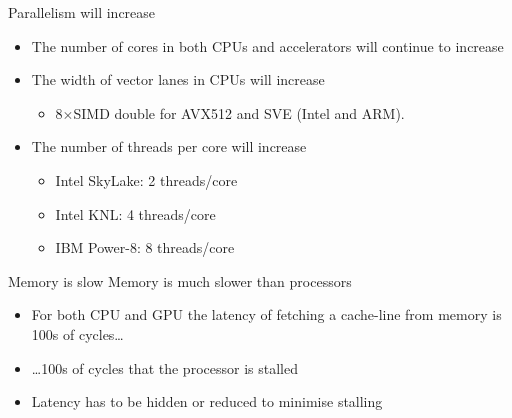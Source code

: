 \documentclass[aspectratio=43]{beamer}
\begin{document}
\begin{frame}[fragile]{Parallelism will increase}
    \begin{itemize}
        \item The number of cores in both CPUs and accelerators will continue to increase
        \item The width of vector lanes in CPUs will increase
        \begin{itemize}
            \item 8$\times$SIMD double for AVX512 and SVE (Intel and ARM).
        \end{itemize}
        \item The number of threads per core will increase
        \begin{itemize}
            \item Intel SkyLake: 2 threads/core
            \item Intel KNL: 4 threads/core
            \item IBM Power-8: 8 threads/core
        \end{itemize}
    \end{itemize}
\end{frame}

\begin{frame}[fragile]{Memory is slow}
    Memory is much slower than processors
    \begin{itemize}
        \item For both CPU and GPU the latency of fetching a cache-line from memory is 100s of cycles\dots
        \item \dots 100s of cycles that the processor is stalled
        \item Latency has to be hidden or reduced to minimise stalling
    \end{itemize}
\end{frame}
\end{document}
